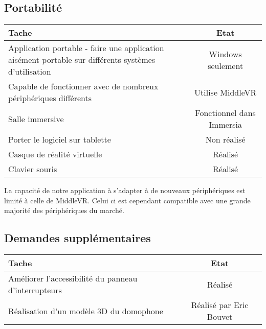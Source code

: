 \subsection{Portabilité}
\begin{tabular}{|p{11cm}|c|}
	\hline
	Tache & Etat \\ \hline
	Application portable - faire une application aisément portable sur différents systèmes d'utilisation & Windows seulement \\ \hline
	Capable de fonctionner avec de nombreux périphériques différents & Utilise MiddleVR \\ \hline
	Salle immersive & Fonctionnel dans Immersia \\ \hline
	Porter le logiciel sur tablette  & Non réalisé \\ \hline
	Casque de réalité virtuelle & Réalisé \\ \hline
	Clavier souris & Réalisé \\ \hline
\end{tabular}
La capacité de notre application à s'adapter à de nouveaux périphériques est limité à celle de MiddleVR. Celui ci est cependant compatible avec une grande majorité des périphériques du marché.

\subsection{Demandes supplémentaires}
\begin{tabular}{|p{11cm}|c|}
	\hline
	Tache & Etat \\ \hline
	Améliorer l'accessibilité du panneau d'interrupteurs & Réalisé \\ \hline
	Réalisation d'un modèle 3D du domophone & Réalisé par Eric Bouvet \\ \hline
\end{tabular}
